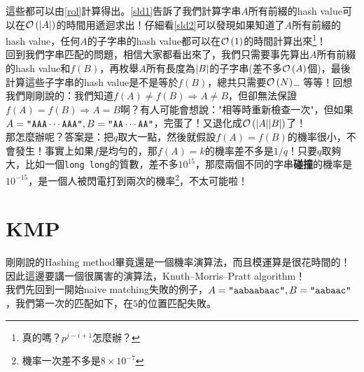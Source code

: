 \documentclass[a4paper,12pt]{book}
\begin{document}
這些都可以由\eqref{rol}計算得出。\eqref{sld1}告訴了我們計算字串$A$所有前綴的hash value可以在$\operatorname{\mathcal{O}}\left(\lvert A \rvert\right)$的時間用遞迴求出！仔細看\eqref{sld2}可以發現如果知道了$A$所有前綴的hash value，任何$A$的子字串的hash value都可以在$\operatorname{\mathcal{O}}\left(1\right)$的時間計算出來\footnote{真的嗎？$p^{j-i+1}$怎麼辦？}！ \\
回到我們字串匹配的問題，相信大家都看出來了，我們只需要事先算出$A$所有前綴的hash value和$f(B)$，再枚舉$A$所有長度為$\lvert B \rvert$的子字串(差不多$\operatorname{\mathcal{O}}\left(A\right)$個)，最後計算這些子字串的hash value是不是等於$f(B)$，總共只需要$\operatorname{\mathcal{O}}\left(N\right)$…
等等！回想我們剛剛說的：我們知道$f(A) \neq f(B) \Rightarrow A \neq B$，但卻無法保證$f(A) = f(B) \Rightarrow A = B$啊？有人可能會想說："相等時重新檢查一次"，但如果$A = \texttt{"AAA}\cdots\texttt{AAA"}, B = \texttt{"AA}\cdots\texttt{AA"}$，完蛋了！又退化成$\operatorname{\mathcal{O}}\left(\lvert A \rvert \lvert B \rvert\right)$了！ \\
那怎麼辦呢？答案是：把$q$取大一點，然後就假設$f(A) = f(B)$的機率很小，不會發生！事實上如果$f$是均勻的，那$f(A) = k$的機率差不多是$1/q$！只要$q$取夠大，比如一個\texttt{long long}的質數，差不多$10^{15}$，那麼兩個不同的字串{\bf 碰撞}的機率是$10^{-15}$，是一個人被閃電打到兩次的機率\footnote{機率一次差不多是$8 \times 10^{-7}$}，不太可能啦！

\section{KMP}
剛剛說的Hashing method畢竟還是一個機率演算法，而且模運算是很花時間的！因此這邊要講一個很厲害的演算法，Knuth–Morris–Pratt algorithm！ \\
我們先回到一開始naive matching失敗的例子，$A = \texttt{"aabaabaac"}, B = \texttt{"aabaac"}$，我們第一次的匹配如下，在$5$的位置匹配失敗。

    \begin{figure}[H]
    \begin{center}
    \end{center}
    \caption{}
    \label{fig:}
    \end{figure}
\end{document}

